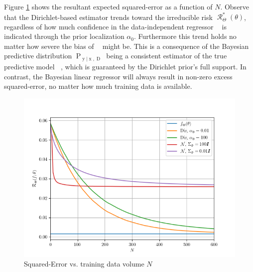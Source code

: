 \documentclass[12pt]{report}
\DeclareMathOperator{\xrm}{\mathrm{x}}
\DeclareMathOperator{\yrm}{\mathrm{y}}
\DeclareMathOperator{\Drm}{\mathrm{D}}
\DeclareMathOperator{\Prm}{\mathrm{P}}
\DeclareMathOperator{\Rcal}{\mathcal{R}}
\DeclareMathOperator{\thetac}{\theta_\text{c}}
\DeclareMathOperator{\alphac}{\alpha_\text{c}}
\begin{document}
Figure \ref{fig:SSP_2021/Risk_cond_SE_N_biased_hard} shows the resultant expected squared-error as a function of $N$. Observe that the Dirichlet-based estimator trends toward the irreducible risk $\Rcal_{\Theta}^*(\theta)$, regardless of how much confidence in the data-independent regressor $\alphac$ is indicated through the prior localization $\alpha_0$. Furthermore this trend holds no matter how severe the bias of $\alphac$ might be. This is a consequence of the Bayesian predictive distribution $\Prm_{\yrm | \xrm,\Drm}$ being a consistent estimator of the true predictive model $\thetac$, which is guaranteed by the Dirichlet prior's full support. In contrast, the Bayesian linear regressor will always result in non-zero excess squared-error, no matter how much training data is available. 
\begin{figure}
\centering
\includegraphics[width=0.8\linewidth]{SSP_2021/Risk_cond_SE_N_biased_hard.png}
\caption{Squared-Error vs. training data volume $N$}
\label{fig:SSP_2021/Risk_cond_SE_N_biased_hard}
\end{figure}
\end{document}
